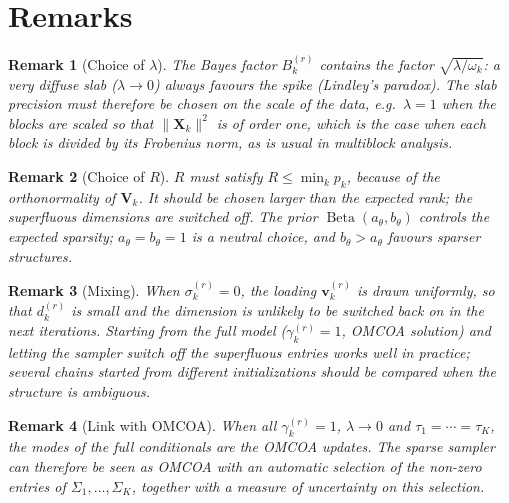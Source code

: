 \documentclass[11pt]{article}
\newtheorem{remark}{Remark}
\DeclareMathOperator{\Be}{Beta}
\newcommand{\X}{\mathbf{X}}
\newcommand{\V}{\mathbf{V}}
\newcommand{\vv}{\mathbf{v}}
\begin{document}
\section{Remarks}

\begin{remark}[Choice of $\lambda$]
The Bayes factor $B_k^{(r)}$ contains the factor $\sqrt{\lambda/\omega_k}$: a very diffuse slab ($\lambda\to0$) always favours
the spike (Lindley's paradox). The slab precision must therefore be chosen on the scale of the data, e.g.\ $\lambda=1$
when the blocks are scaled so that $\|\X_k\|^2$ is of order one, which is the case when each block is divided by its
Frobenius norm, as is usual in multiblock analysis.
\end{remark}

\begin{remark}[Choice of $R$]
$R$ must satisfy $R\leq\min_kp_k$, because of the orthonormality of $\V_k$. It should be chosen larger than the expected
rank; the superfluous dimensions are switched off. The prior $\Be(a_\theta,b_\theta)$ controls the expected sparsity;
$a_\theta=b_\theta=1$ is a neutral choice, and $b_\theta>a_\theta$ favours sparser structures.
\end{remark}

\begin{remark}[Mixing]
When $\sigma_k^{(r)}=0$, the loading $\vv_k^{(r)}$ is drawn uniformly, so that $d_k^{(r)}$ is small and the dimension is
unlikely to be switched back on in the next iterations. Starting from the full model ($\gamma_k^{(r)}=1$, OMCOA
solution) and letting the sampler switch off the superfluous entries works well in practice; several chains
started from different initializations should be compared when the structure is ambiguous.
\end{remark}

\begin{remark}[Link with OMCOA]
When all $\gamma_k^{(r)}=1$, $\lambda\to0$ and $\tau_1=\cdots=\tau_K$, the modes of the full conditionals are the OMCOA updates.
The sparse sampler can therefore be seen as OMCOA with an automatic selection of the non-zero entries of
$\Sigma_1,\ldots,\Sigma_K$, together with a measure of uncertainty on this selection.
\end{remark}
\end{document}
